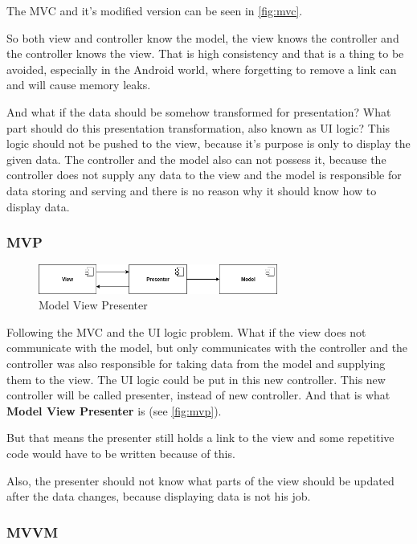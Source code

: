 The MVC and it's modified version can be seen in \autoref{fig:mvc}.

So both view and controller know the model, the view knows the controller and the controller knows the view.
That is high consistency and that is a thing to be avoided, especially in the Android world, where forgetting to remove a link can and will cause memory leaks.

And what if the data should be somehow transformed for presentation?
What part should do this presentation transformation, also known as UI logic?
This logic should not be pushed to the view, because it's purpose is only to display the given data.
The controller and the model also can not possess it, because the controller does not supply any data to the view and the model is responsible for data storing and serving and there is no reason why it should know how to display data.

\subsubsection{MVP}

\begin{figure}\centering
	\includegraphics[width=0.7\textwidth]{pics/patterns/bc-mvp.png}
	\caption[MVP]{Model View Presenter}\label{fig:mvp}
\end{figure}

Following the MVC and the UI logic problem.
What if the view does not communicate with the model, but only communicates with the controller and the controller was also responsible for taking data from the model and supplying them to the view.
The UI logic could be put in this new controller. This new controller will be called presenter, instead of new controller.
And that is what \textbf{Model View Presenter} is (see \autoref{fig:mvp}). \cite{droidcon}

But that means the presenter still holds a link to the view and some repetitive code would have to be written because of this. \cite{mvp}

Also, the presenter should not know what parts of the view should be updated after the data changes, because displaying data is not his job.

\subsubsection{MVVM}
\label{subsec:mvvm}

